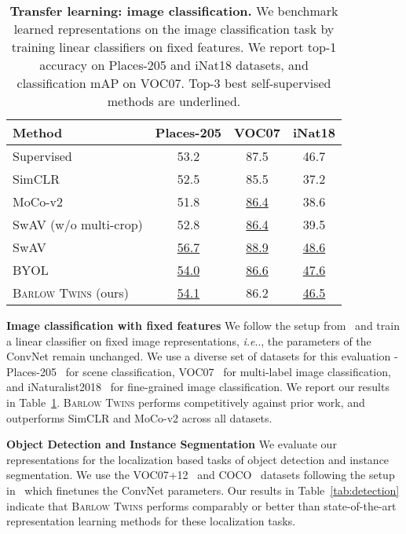 \documentclass{article}
\makeatletter
\newcommand{\AlgoName}{\textsc{Barlow Twins}}
\DeclareRobustCommand\onedot{\futurelet\@let@token\@onedot}
\def\@onedot{\ifx\@let@token.\else.\null\fi\xspace}
\def\ie{\emph{i.e}\onedot} \def\Ie{\emph{I.e}\onedot}
\makeatother
\begin{document}
\begin{table}[ht]
\caption{\textbf{Transfer learning: image classification.} We benchmark learned representations on the image classification task by training linear classifiers on fixed features. We report top-1 accuracy on Places-205 and iNat18 datasets, and classification mAP on VOC07. Top-3 best self-supervised methods are underlined.}
\label{tab:linear_transfer}
\vskip 0.15in
\begin{center}
\begin{tabular}{@{}lccc@{}}
\toprule
Method & Places-205 & VOC07 & iNat18 \\
\midrule
Supervised & 53.2 & 87.5 & 46.7\\
\midrule
SimCLR & 52.5 & 85.5 & 37.2 \\
MoCo-v2 & 51.8 & \underline{86.4} & 38.6 \\
SwAV (w/o multi-crop) & 52.8 & \underline{86.4} & 39.5 \\
SwAV & \underline{56.7} & \underline{88.9} & \underline{48.6} \\
BYOL & \underline{54.0} & \underline{86.6} & \underline{47.6} \\
\AlgoName{} (ours) & \underline{54.1} & 86.2 & \underline{46.5} \\
\bottomrule
\end{tabular}
\end{center}
\vskip -0.1in
\end{table} 
\par \noindent \textbf{Image classification with fixed features} We follow the setup from~\cite{misra2019self} and train a linear classifier on fixed image representations, \ie, the parameters of the ConvNet remain unchanged. We use a diverse set of datasets for this evaluation - Places-205~\cite{zhou2014learning} for scene classification, VOC07~\cite{everingham2010pascal} for multi-label image classification, and iNaturalist2018~\cite{van2018inaturalist} for fine-grained image classification. We report our results in Table~\ref{tab:linear_transfer}. \AlgoName{} performs competitively against prior work, and outperforms SimCLR and MoCo-v2 across all datasets.


\par \noindent \textbf{Object Detection and Instance Segmentation} We evaluate our representations for the localization based tasks of object detection and instance segmentation. We use the VOC07+12~\cite{everingham2010pascal} and COCO~\cite{lin2014microsoft} datasets following the setup in~\cite{he2019momentum} which finetunes the ConvNet parameters. Our results in Table~\ref{tab:detection} indicate that \AlgoName{} performs comparably or better than state-of-the-art representation learning methods for these localization tasks.
\end{document}
